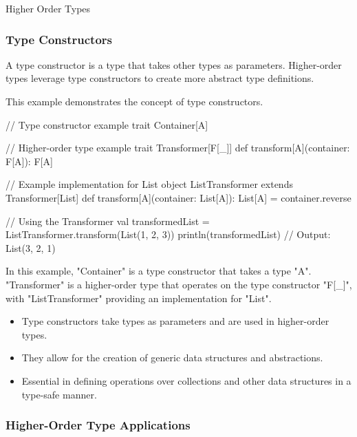 \begin{notes}{Higher Order Types}
\begin{highlight}
    \end{highlight}
    
    \subsubsection*{Type Constructors}
    
    A type constructor is a type that takes other types as parameters. Higher-order types leverage type constructors to create more abstract type definitions.
    
    \begin{highlight}
    
        This example demonstrates the concept of type constructors.
    
    \begin{code}[Scala]
    // Type constructor example
    trait Container[A]
    
    // Higher-order type example
    trait Transformer[F[_]] {
        def transform[A](container: F[A]): F[A]
    }
    
    // Example implementation for List
    object ListTransformer extends Transformer[List] {
        def transform[A](container: List[A]): List[A] = container.reverse
    }
    
    // Using the Transformer
    val transformedList = ListTransformer.transform(List(1, 2, 3))
    println(transformedList)  // Output: List(3, 2, 1)
    \end{code}
    
        In this example, "Container" is a type constructor that takes a type "A". "Transformer" is a higher-order type that operates on the type constructor "F[\_]", with "ListTransformer" providing an implementation for "List".
    
        \begin{itemize}
            \item Type constructors take types as parameters and are used in higher-order types.
            \item They allow for the creation of generic data structures and abstractions.
            \item Essential in defining operations over collections and other data structures in a type-safe manner.
        \end{itemize}
    
    \end{highlight}
    
    \subsubsection*{Higher-Order Type Applications}
    

\end{notes}
